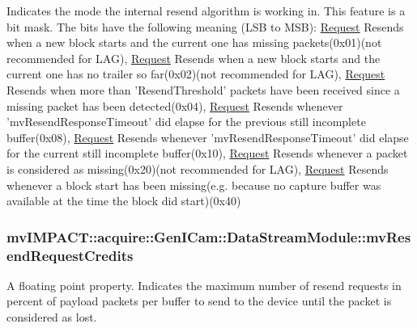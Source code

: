 Indicates the mode the internal resend algorithm is working in. This feature is a bit mask. The bits have the following meaning (L\+S\+B to M\+S\+B)\+: \hyperlink{classmv_i_m_p_a_c_t_1_1acquire_1_1_request}{Request} Resends when a new block starts and the current one has missing packets(0x01)(not recommended for L\+A\+G), \hyperlink{classmv_i_m_p_a_c_t_1_1acquire_1_1_request}{Request} Resends when a new block starts and the current one has no trailer so far(0x02)(not recommended for L\+A\+G), \hyperlink{classmv_i_m_p_a_c_t_1_1acquire_1_1_request}{Request} Resends when more than 'Resend\+Threshold' packets have been received since a missing packet has been detected(0x04), \hyperlink{classmv_i_m_p_a_c_t_1_1acquire_1_1_request}{Request} Resends whenever 'mv\+Resend\+Response\+Timeout' did elapse for the previous still incomplete buffer(0x08), \hyperlink{classmv_i_m_p_a_c_t_1_1acquire_1_1_request}{Request} Resends whenever 'mv\+Resend\+Response\+Timeout' did elapse for the current still incomplete buffer(0x10), \hyperlink{classmv_i_m_p_a_c_t_1_1acquire_1_1_request}{Request} Resends whenever a packet is considered as missing(0x20)(not recommended for L\+A\+G), \hyperlink{classmv_i_m_p_a_c_t_1_1acquire_1_1_request}{Request} Resends whenever a block start has been missing(e.\+g. because no capture buffer was available at the time the block did start)(0x40) \hypertarget{classmv_i_m_p_a_c_t_1_1acquire_1_1_gen_i_cam_1_1_data_stream_module_a66859d673975f0f4e4bebe6d3e780c45}{
\subsubsection[{mv\+Resend\+Request\+Credits}]{ mv\+I\+M\+P\+A\+C\+T\+::acquire\+::\+Gen\+I\+Cam\+::\+Data\+Stream\+Module\+::mv\+Resend\+Request\+Credits}}\label{classmv_i_m_p_a_c_t_1_1acquire_1_1_gen_i_cam_1_1_data_stream_module_a66859d673975f0f4e4bebe6d3e780c45}


A floating point property. Indicates the maximum number of resend requests in percent of payload packets per buffer to send to the device until the packet is considered as lost. 

